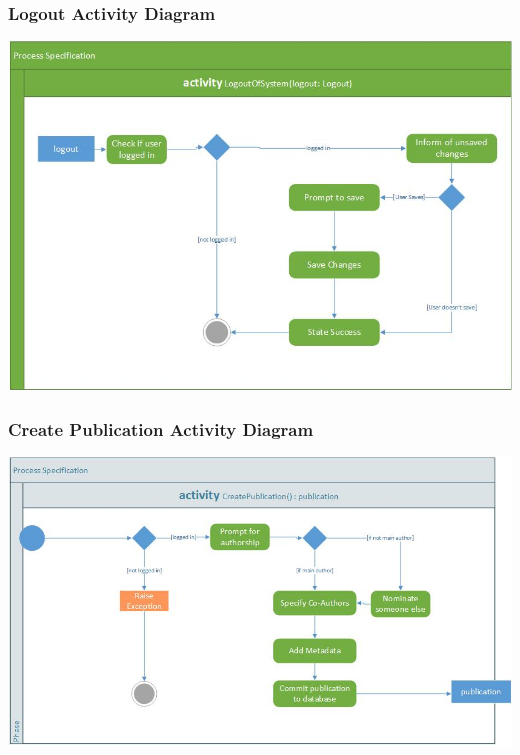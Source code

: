 \documentclass[a4paper,12pt]{article}
\begin{document}
	\subsubsection{Logout Activity Diagram}
	\includegraphics[width=1\textwidth]{./activity_logout.jpg}\\[1.5cm]
	
	\subsubsection{Create Publication Activity Diagram}
	\includegraphics[width=1\textwidth]{./activity_create_pub.jpg}\\[1.5cm]
\end{document}
